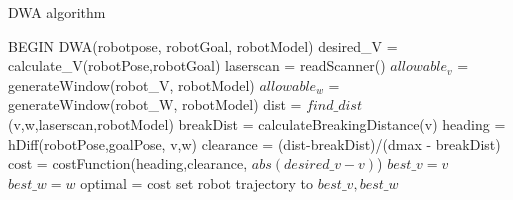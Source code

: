 \begin{algorithm}
\caption{DWA algorithm}
\begin{algorithmic}
\STATE BEGIN DWA(robotpose, robotGoal, robotModel)
\STATE desired\_V = calculate\_V(robotPose,robotGoal)
\STATE   laserscan = readScanner()
\STATE   $allowable_v$ = generateWindow(robot\_V, robotModel)
\STATE   $allowable_w$  = generateWindow(robot\_W, robotModel)
      \STATE dist = $find\_dist$(v,w,laserscan,robotModel)
      \STATE breakDist = calculateBreakingDistance(v)
         \STATE heading = hDiff(robotPose,goalPose, v,w)
         \STATE clearance = (dist-breakDist)/(dmax - breakDist)
         \STATE cost = costFunction(heading,clearance, $abs(desired\_v - v)$)
            \STATE $best\_v = v$
            \STATE $best\_w = w$
            \STATE optimal = cost
        \ENDIF
      \ENDIF
      \ENDFOR
\ENDFOR
\STATE  set robot trajectory to $best\_v, best\_w$
\END
\end{algorithmic}
\end{algorithm}
\newpage
